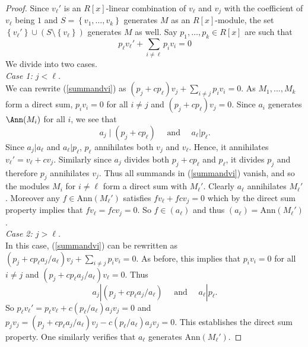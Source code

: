 \begin{proof}  Since $ v_{\ell}' $ is an $R[x]$-linear combination of $ v_{\ell} $ and $ v_{j} $ with the coefficient of $ v_{\ell} $ being $ 1 $ and $ S =  \left \{  v_{1},  \ldots,  v_{k}   \right \} $ generates $ M $ as an $R[x]$-module, the set $  \left \{ v_{\ell} ' \right \} \cup ( S \setminus \left \{ v_{\ell} \right \} ) $  generates $ M $  as  well.     Say $ p_{1} ,  \ldots,  p_{k} \in  R[x]  $ are such that
\begin{equation}  \label{summandvi} \displaystyle p_{\ell} v_{\ell} ' +  \sum_{ i \neq \ell} p_{i} v_{i}  =  0  
\end{equation}      We divide into two cases. \\

\textit{Case 1: $j < \ell $.} \\

We can rewrite (\ref{summandvi}) as $   (p_{j} + c p_{\ell}  )   v_{j  }    +   \sum _{ i \neq j }  p_{i}   v_{i}   =  0   $. As $ M_{1} , \ldots, M_{k} $ form a direct sum,  $ p_{i} v_{i} = 0 $ for all $ i \neq j $ and   $ (p_{j} + cp_{\ell}) v_{j}  = 0  $.  Since $ a_{i} $ generates  $  \Ann  (M _{i })    $ for all $ i $, we see that   $$  a_{j}  \mid ( p_{j}  + c p_{
\ell}) \quad  \text{ and }  \quad    a_{\ell}  |  p_{\ell}  . $$ 
Since $ a_{j} | a_{\ell} $ and $ a_{\ell} | p_{\ell} $, $ p_{\ell} $ annihilates both $ v_{j} $ and $ v_{\ell} $. Hence, it annihilates $ v_{\ell} ' = v_{\ell} + c v_{j} $. Similarly since $ a_{j} $ divides  both $ p_{j} + c p_{\ell} $ and $ p_{\ell} $, it divides $ p_{j} $ and therefore $ p_{j} $ annihilates $ v_{j} $.  Thus all summands in (\ref{summandvi})  vanish, and so the modules $ M_{i} $ for $ i \neq \ell $ 
form a direct sum with $ M_{\ell} '  $. Clearly $ a_{\ell } $ annihilates $ M_{\ell} ' $. Moreover any  
$ f \in \mathrm{Ann}(M_{\ell}  '    )  $ satisfies $  f v_{\ell} +  f c v_{j} = 0 $ which by the direct sum property  implies that   $ f v_{\ell} = fcv_{j} = 0 $. So $ f \in ( a_{\ell} ) $ and thus  $ (a_{\ell} ) =  \mathrm{Ann}(M_{\ell}') $. \\

\textit{Case 2:   $ j > \ell $.} \\

 In this case, (\ref{summandvi}) can be rewritten as $ (p_{j} + c p_{\ell}  a_{j} /  a_{\ell}  ) v_{j} + \sum_{i \neq j} p_{i} v_{i} = 0 $.  As before, this implies that $ p_{i} v_{i} = 0 $ for all $i \neq j $ and $ (p_{j} + c  p_{\ell} a_{j} / a_{\ell}  )  v_{\ell} = 0 $.  Thus $$  a_{j} |  (  p_{j} + c p_{\ell} a_{j} / a_{\ell} ) \quad \text{ and } \quad a_{\ell} | p_{\ell} . $$ 
So $     p_{\ell} v_{\ell} '  = p_{\ell}    v_{\ell} +  c  \left (  p_ { \ell}  /   {  a_{\ell}  }  \right )    a_{j} v_{j}         =  0 $ and $    p_{j} v_{j}  =     (  p_{j} + c p_{\ell}  a_{j}/ a_{\ell}  )   v_{j}  -    c ( p_{\ell} / a_{\ell} )  a_{j} v_{j} = 0  $. This  establishes the direct sum property.  One similarly verifies  that $ a_{\ell} $ generates $ \mathrm{Ann}(M_{\ell} ' ) $.          
\end{proof} 





